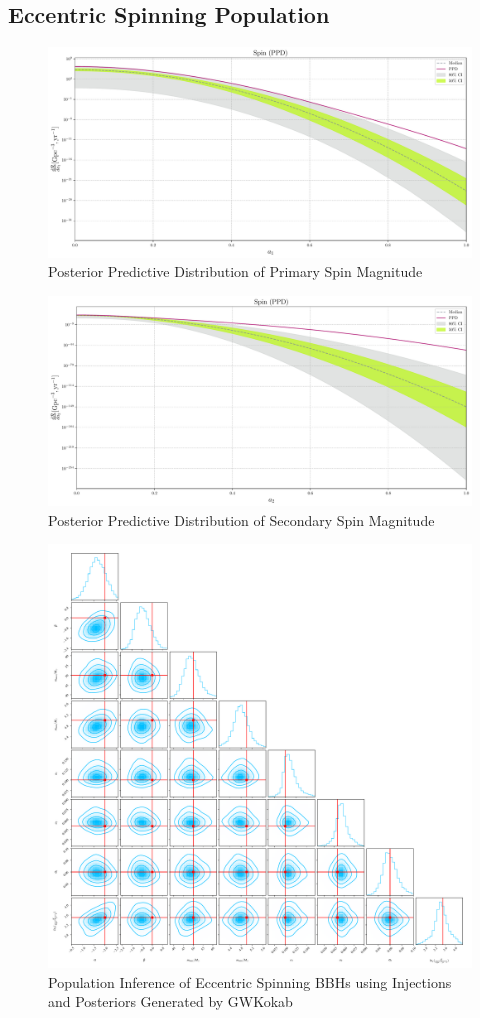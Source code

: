 \documentclass[a0,portrait]{a0poster}
\begin{document}
\begin{multicols}{3}
\columnbreak


\section*{Eccentric Spinning Population}

\begin{frame}

\begin{figure}[H]
    \centering
    \includegraphics[width=0.7\linewidth]{assets/plots/rate_a_1_ppd_plot.pdf}
    \caption{Posterior Predictive Distribution of Primary Spin Magnitude}
    \label{fig:ppd-a1}
\end{figure}

\begin{figure}[H]
    \centering
    \includegraphics[width=0.7\linewidth]{assets/plots/rate_a_2_ppd_plot.pdf}
    \caption{Posterior Predictive Distribution of Secondary Spin Magnitude}
    \label{fig:ppd-a2}
\end{figure}

\begin{figure}[H]
    \centering
    \includegraphics[width=0.7\linewidth]{assets/plots/ecc_spin_corner.pdf}
    \caption{Population Inference of Eccentric Spinning BBHs using Injections and Posteriors Generated by GWKokab}
    \label{fig:ecc_spin_corner}
\end{figure}


\end{frame}
\end{multicols}
\end{document}
